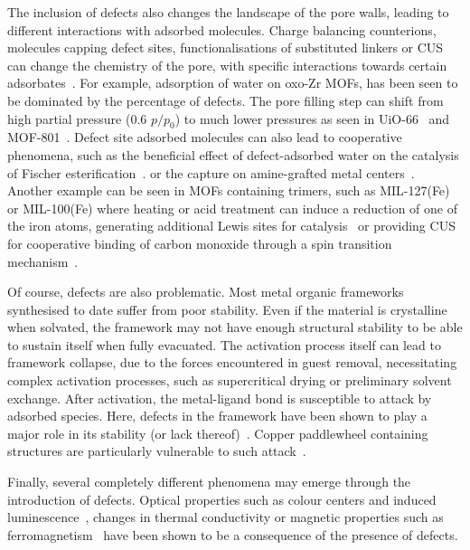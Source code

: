 The inclusion of defects also changes the landscape of the pore
walls, leading to different interactions with adsorbed molecules.
Charge balancing counterions, molecules capping defect sites,
functionalisations of substituted linkers or \gls{CUS} can change the
chemistry of the pore, with specific interactions towards certain
adsorbates~\cite{dissegnaUsingWaterAdsorption2017}.
For example, adsorption of water on oxo-Zr \glspl{MOF}, has been seen to
be dominated by the percentage of defects. The pore filling step can
shift from high partial pressure (0.6 \(p/p_0\)) to much lower pressures
as seen in UiO-66~\cite{ghoshWaterAdsorptionUiO662014} and
MOF-801~\cite{choiRoleStructuralDefects2018}. Defect site adsorbed
molecules can also lead to cooperative phenomena,
such as the beneficial effect of defect-adsorbed water on the
catalysis of Fischer esterification~\cite{caratelliNatureActiveSites2017}.
or the  capture on amine-grafted metal 
centers~\cite{mcdonaldCooperativeInsertionCO22015}.
Another example can be seen in \glspl{MOF} containing  trimers,
such as MIL-127(Fe) or MIL-100(Fe) where heating or acid treatment
can induce a reduction of one of the iron atoms, generating
additional Lewis sites for catalysis~\cite{yoonControlledReducibilityMetalOrganic2010}
or providing \gls{CUS} for cooperative binding of carbon monoxide through
a spin transition mechanism~\cite{reedSpinTransitionMechanism2017}.

Of course, defects are also problematic. Most metal organic frameworks
synthesised to date suffer from poor stability. Even if the material
is crystalline when solvated, the framework may not have
enough structural stability to be able to sustain itself when fully
evacuated. The activation process itself can lead to framework
collapse, due to the forces encountered in guest removal, necessitating
complex activation processes, such as supercritical drying or
preliminary solvent exchange. After activation, the metal-ligand bond
is susceptible to attack by adsorbed species. Here, defects in the framework
have been shown to play a major role in its stability (or lack
thereof)~\cite{burtchWaterStabilityAdsorption2014}.
Copper paddlewheel containing structures are particularly vulnerable to
such attack~\cite{alvarezStructureStabilityHKUST12017}.

Finally, several completely different phenomena may emerge through
the introduction of defects. Optical properties such as colour
centers and induced luminescence~\cite{mullerDefectsColorCenters2017},
changes in thermal conductivity or magnetic properties
such as ferromagnetism~\cite{shenOriginLongRangeFerromagnetic2012}
have been shown to be a consequence of the presence of defects.

